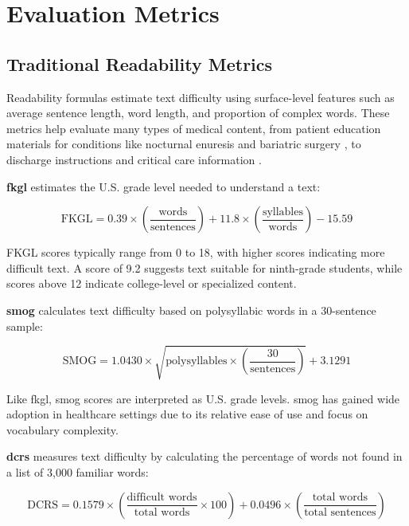 \section{Evaluation Metrics}

\subsection{Traditional Readability Metrics}
\label{subsec:traditional-metrics}

Readability formulas estimate text difficulty using surface-level features such as average sentence length, word length, and proportion of complex words. These metrics help evaluate many types of medical content, from patient education materials for conditions like nocturnal enuresis \cite{Fung2024-uh} and bariatric surgery \cite{Lucy2023-zi}, to discharge instructions \cite{Tuan2023-wc} and critical care information \cite{Hanci2024-wv}.

\textbf{\gls{fkgl}} estimates the U.S. grade level needed to understand a text:

\begin{equation}
    \text{FKGL} = 0.39 \times \left(\frac{\text{words}}{\text{sentences}}\right) + 11.8 \times \left(\frac{\text{syllables}}{\text{words}}\right) - 15.59
\end{equation}

FKGL scores typically range from 0 to 18, with higher scores indicating more difficult text. A score of 9.2 suggests text suitable for ninth-grade students, while scores above 12 indicate college-level or specialized content.

\textbf{\gls{smog}} calculates text difficulty based on polysyllabic words in a 30-sentence sample:

\begin{equation}
    \text{SMOG} = 1.0430 \times \sqrt{\text{polysyllables} \times \left(\frac{30}{\text{sentences}}\right)} + 3.1291
\end{equation}

Like \gls{fkgl}, \gls{smog} scores are interpreted as U.S. grade levels. 
\gls{smog} has gained wide adoption in healthcare settings due to its relative ease of use and focus on vocabulary complexity.

\textbf{\gls{dcrs}} measures text difficulty by calculating the percentage of words not found in a list of 3,000 familiar words:

\begin{equation}
    \text{DCRS} = 0.1579 \times \left(\frac{\text{difficult words}}{\text{total words}} \times 100\right) + 0.0496 \times \left(\frac{\text{total words}}{\text{total sentences}}\right)
\end{equation}

